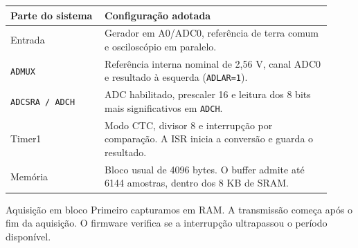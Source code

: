 \small
\begin{tabular}{p{0.27\linewidth}p{0.65\linewidth}}
\hline
\textbf{Parte do sistema} & \textbf{Configuração adotada} \\\hline
Entrada & Gerador em A0/ADC0, referência de terra comum e osciloscópio em paralelo. \\[0.15cm]
\texttt{ADMUX} & Referência interna nominal de 2,56 V, canal ADC0 e resultado à esquerda (\texttt{ADLAR=1}). \\[0.15cm]
\texttt{ADCSRA / ADCH} & ADC habilitado, prescaler 16 e leitura dos 8 bits mais significativos em \texttt{ADCH}. \\[0.15cm]
Timer1 & Modo CTC, divisor 8 e interrupção por comparação. A ISR inicia a conversão e guarda o resultado. \\[0.15cm]
Memória & Bloco usual de 4096 bytes. O buffer admite até 6144 amostras, dentro dos 8 KB de SRAM. \\\hline
\end{tabular}
\begin{exampleblock}{Aquisição em bloco}
Primeiro capturamos em RAM. A transmissão começa após o fim da aquisição. O firmware verifica se a interrupção ultrapassou o período disponível.
\end{exampleblock}
